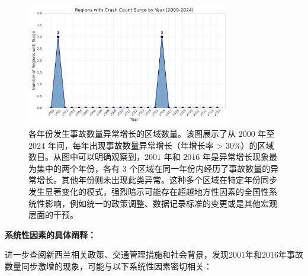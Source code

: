 \documentclass[12pt,a4paper]{article}
\begin{document}
\begin{figure}[H]
\centering
\includegraphics[width=0.8\textwidth]{year_surge_counts.png}
\caption{各年份发生事故数量异常增长的区域数量。该图展示了从 $2000$ 年至 $2024$ 年间，每年出现事故数量异常增长（年增长率 > $30\%$）的区域数目。从图中可以明确观察到，$2001$ 年和 $2016$ 年是异常增长现象最为集中的两个年份，各有 $3$ 个区域在同一年份内经历了事故数量的异常增长。其他年份则未出现此类异常。这种多个区域在特定年份同步发生显著变化的模式，强烈暗示可能存在超越地方性因素的全国性系统性影响，例如统一的政策调整、数据记录标准的变更或是其他宏观层面的干预。}
\label{fig:year_surge_counts}
\end{figure}

\textbf{系统性因素的具体阐释：}

进一步查阅新西兰相关政策、交通管理措施和社会背景，发现$2001$年和$2016$年事故数量同步激增的现象，可能与以下系统性因素密切相关：
\end{document}
